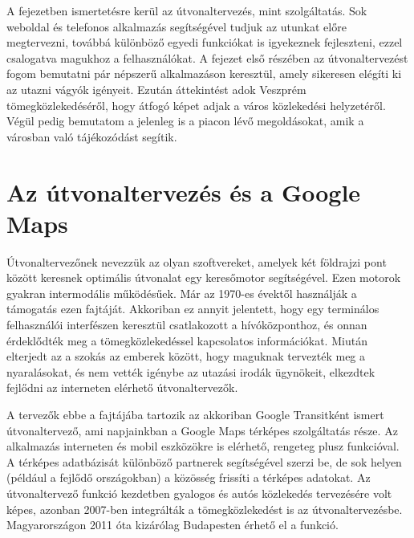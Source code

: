 
A fejezetben ismertetésre kerül az útvonaltervezés, mint szolgáltatás. 
Sok weboldal és telefonos alkalmazás segítségével tudjuk az utunkat előre megtervezni, továbbá különböző egyedi funkciókat is igyekeznek fejleszteni, ezzel csalogatva magukhoz a felhasználókat. 
A fejezet első részében az útvonaltervezést fogom bemutatni pár népszerű alkalmazáson keresztül, amely sikeresen elégíti ki az utazni vágyók igényeit. 
Ezután áttekintést adok Veszprém tömegközlekedéséről, hogy átfogó képet adjak a város közlekedési helyzetéről. 
Végül pedig bemutatom a jelenleg is a piacon lévő megoldásokat, amik a városban való tájékozódást segítik. 


\section{Az útvonaltervezés és a Google Maps}
\label{utvonalterv}

Útvonaltervezőnek nevezzük az olyan szoftvereket, amelyek két földrajzi pont között keresnek optimális útvonalat egy keresőmotor segítségével. 
Ezen motorok gyakran intermodális működésűek. 
Már az 1970-es évektől használják a támogatás ezen fajtáját. 
Akkoriban ez annyit jelentett, hogy egy terminálos felhasználói interfészen keresztül csatlakozott a hívóközponthoz, és onnan érdeklődték meg a tömegközlekedéssel kapcsolatos információkat. 
Miután elterjedt az a szokás az emberek között, hogy maguknak tervezték meg a nyaralásokat, és nem vették igénybe az utazási irodák ügynökeit, elkezdtek fejlődni az interneten elérhető útvonaltervezők. 

A tervezők ebbe a fajtájába tartozik az akkoriban Google Transitként ismert útvonaltervező, ami napjainkban a Google Maps térképes szolgáltatás része. 
Az alkalmazás interneten és mobil eszközökre is elérhető, rengeteg plusz funkcióval. 
A térképes adatbázisát különböző partnerek segítségével szerzi be, de sok helyen (például a fejlődő országokban) a közösség frissíti a térképes adatokat. 
Az útvonaltervező funkció kezdetben gyalogos és autós közlekedés tervezésére volt képes, azonban 2007-ben integrálták a tömegközlekedést is az útvonaltervezésbe. 
Magyarországon 2011 óta kizárólag Budapesten érhető el a funkció. 


